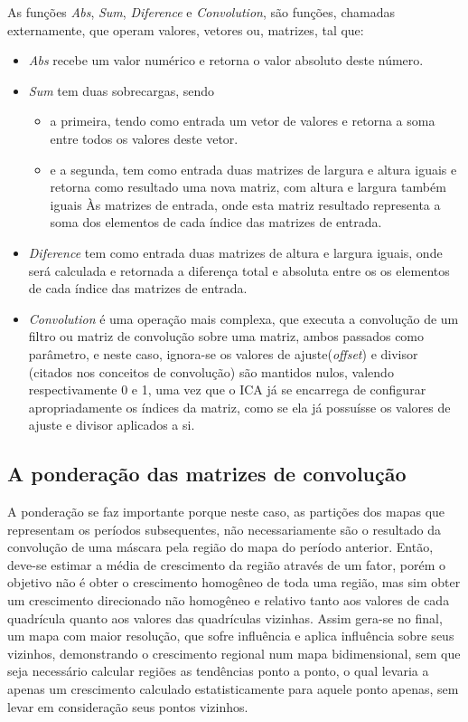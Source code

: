 As funções \emph{Abs}, \emph{Sum}, \emph{Diference} e \emph{Convolution}, são funções, chamadas externamente, que operam valores, vetores ou, matrizes, tal que:
\begin{itemize}
\item \emph{Abs} recebe um valor numérico e retorna o valor absoluto deste número.
\item \emph{Sum} tem duas sobrecargas, sendo
\begin{itemize}
\item a primeira, tendo como entrada um vetor de valores e retorna a soma entre todos os valores deste vetor.
\item e a segunda, tem como entrada duas matrizes de largura e altura iguais e retorna como resultado uma nova matriz, com altura e largura também iguais Às matrizes de entrada, onde esta matriz resultado representa a soma dos elementos de cada índice das matrizes de entrada.
\end{itemize}
\item \emph{Diference} tem como entrada duas matrizes de altura e largura iguais, onde será calculada e retornada a diferença total e absoluta entre os os elementos de cada índice das matrizes de entrada.
\item \emph{Convolution} é uma operação mais complexa, que executa a convolução de um filtro ou matriz de convolução sobre uma matriz, ambos passados como parâmetro, e neste caso, ignora-se os valores de ajuste(\emph{offset}) e divisor (citados nos conceitos de convolução) são mantidos nulos, valendo respectivamente 0 e 1, uma vez que o ICA já se encarrega de configurar apropriadamente os índices da matriz, como se ela já possuísse os valores de ajuste e divisor aplicados a si.
\end{itemize}








\subsection{A ponderação das matrizes de convolução}
\label{A ponderação das matrizes de convolução}

A ponderação se faz importante porque neste caso, as partições dos mapas que representam os períodos subsequentes, não necessariamente são o resultado da convolução de uma máscara pela região do mapa do período anterior. Então, deve-se estimar a média de crescimento da região através de um fator, porém o objetivo não é obter o crescimento homogêneo de toda uma região, mas sim obter um crescimento direcionado não homogêneo e relativo tanto aos valores de cada quadrícula quanto aos valores das quadrículas vizinhas. Assim gera-se no final, um mapa com maior resolução, que sofre influência e aplica influência sobre seus vizinhos, demonstrando o crescimento regional num mapa bidimensional, sem que seja necessário calcular regiões as tendências ponto a ponto, o qual levaria a apenas um crescimento calculado estatisticamente para aquele ponto apenas, sem levar em consideração seus pontos vizinhos.

